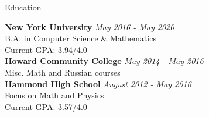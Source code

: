 \documentclass{resume} %
\begin{document}

\begin{rSection}{Education}

{\bf New York University} \hfill {\em May 2016 - May 2020} \\ 
B.A. in Computer Science \& Mathematics \smallskip \\
Current GPA: 3.94/4.0 \smallskip \\
{\bf Howard Community College} \hfill {\em May 2014 - May 2016} \\ 
Misc. Math and Russian courses \smallskip \\
{\bf Hammond High School} \hfill {\em August 2012 - May 2016} \\ 
Focus on Math and Physics \smallskip \\
Current GPA: 3.57/4.0

\end{rSection}

\end{document}
